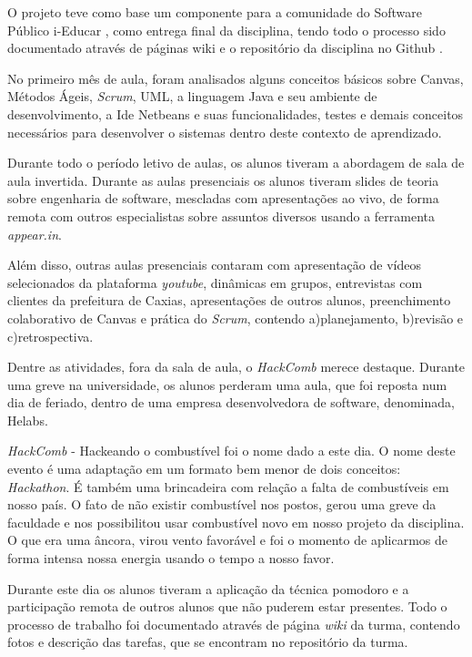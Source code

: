 O projeto teve como base um componente para a comunidade do Software Público i-Educar \citep{portal_i-educar_2009}, como entrega final da disciplina, tendo todo o processo sido documentado através de páginas wiki e o repositório da disciplina no Github \citep{github_fes-ufrj_2018}.

No primeiro mês de aula, foram analisados alguns conceitos básicos sobre Canvas, Métodos Ágeis, \textit{Scrum}, UML, a linguagem Java e seu ambiente de desenvolvimento, a Ide Netbeans e suas funcionalidades, testes e demais conceitos necessários para desenvolver o sistemas dentro deste contexto de aprendizado.

Durante todo o período letivo de aulas, os alunos tiveram a abordagem de sala de aula invertida. Durante as aulas presenciais os alunos tiveram slides de teoria sobre engenharia de software, mescladas com apresentações ao vivo, de forma remota com outros especialistas sobre assuntos diversos usando a ferramenta \textit{appear.in}. 

Além disso, outras aulas presenciais contaram com apresentação de vídeos selecionados da plataforma \textit{youtube}, dinâmicas em grupos, entrevistas com clientes da prefeitura de Caxias, apresentações de outros alunos, preenchimento colaborativo de Canvas e prática do \textit{Scrum}, contendo a)planejamento, b)revisão e c)retrospectiva.

Dentre as atividades, fora da sala de aula, o \textit{HackComb} merece destaque. Durante uma greve na universidade, os alunos perderam uma aula, que foi reposta num dia de feriado, dentro de uma empresa desenvolvedora de software, denominada, Helabs. 

\textit{HackComb} - Hackeando o combustível foi o nome dado a este dia. O nome deste evento é uma adaptação em um formato bem menor de dois conceitos: \textit{Hackathon}. É também uma brincadeira com relação a falta de combustíveis em nosso país. O fato de não existir combustível nos postos, gerou uma greve da faculdade e nos possibilitou usar combustível novo em nosso projeto da disciplina. O que era uma âncora, virou vento favorável e foi o momento de aplicarmos de forma intensa nossa energia usando o tempo a nosso favor.

Durante este dia os alunos tiveram a aplicação da técnica pomodoro  e a participação remota de outros alunos que não puderem estar presentes. Todo o processo de trabalho foi documentado através de página \textit{wiki} da turma, contendo fotos e descrição das tarefas, que se encontram no repositório da turma.  

